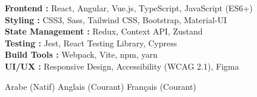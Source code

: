 \documentclass[11pt,a4paper]{article}
\begin{document}
{\small
\textbf{Frontend :} React, Angular, Vue.js, TypeScript, JavaScript (ES6+)\\[1.5pt]
\textbf{Styling :} CSS3, Sass, Tailwind CSS, Bootstrap, Material-UI\\[1.5pt]
\textbf{State Management :} Redux, Context API, Zustand\\[1.5pt]
\textbf{Testing :} Jest, React Testing Library, Cypress\\[1.5pt]
\textbf{Build Tools :} Webpack, Vite, npm, yarn\\[1.5pt]
\textbf{UI/UX :} Responsive Design, Accessibility (WCAG 2.1), Figma
}

Arabe (Natif) \textbar{} Anglais (Courant) \textbar{} Français (Courant)

\end{document}

